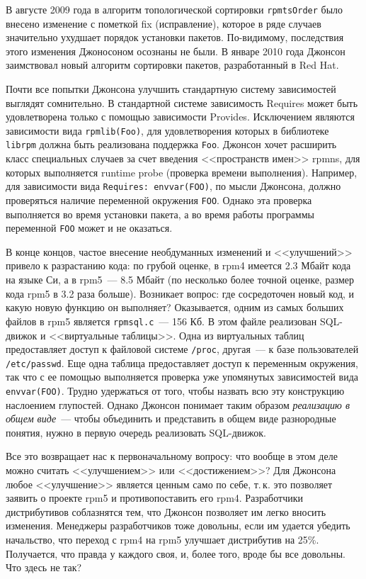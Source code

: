\documentclass[russian,a4paper,12pt,titlepage]{article}
\begin{document}
В августе 2009 года в алгоритм топологической сортировки \verb|rpmtsOrder| было внесено изменение с пометкой fix
(исправление), которое в ряде случаев значительно ухудшает порядок установки пакетов.  По-видимому, последствия
этого изменения Джоносоном осознаны не были.  В январе 2010 года Джонсон заимствовал новый алгоритм сортировки
пакетов, разработанный в Red Hat.

Почти все попытки Джонсона улучшить стандартную систему зависимостей выглядят сомнительно.  В стандартной системе
зависимость Requires может быть удовлетворена только с помощью зависимости Provides.  Исключением являются зависимости
вида \verb|rpmlib(Foo)|, для удовлетворения которых в библиотеке \verb|librpm| должна быть реализована поддержка \verb|Foo|.
Джонсон хочет расширить класс специальных случаев за счет введения <<пространств имен>> rpmns, для которых выполняется
runtime probe (проверка времени выполнения).  Например, для зависимости вида \verb|Requires: envvar(FOO)|, по мысли Джонсона,
должно проверяться наличие переменной окружения \verb|FOO|.  Однако эта проверка выполняется во время установки пакета,
а во время работы программы переменной \verb|FOO| может и не оказаться.

В конце концов, частое внесение необдуманных изменений и <<улучшений>> привело к разрастанию кода: по грубой оценке,
в rpm4 имеется 2.3 Мбайт кода на языке Си, а в rpm5~--- 8.5 Мбайт (по несколько более точной оценке, размер кода
rpm5 в 3.2 раза больше).  Возникает вопрос: где сосредоточен новый код, и какую новую функцию он выполняет?
Оказывается, одним из самых больших файлов в rpm5 является \verb|rpmsql.c|~--- 156 Кб.  В этом файле
реализован SQL-движок и <<виртуальные таблицы>>.  Одна из виртуальных таблиц предоставляет
доступ к файловой системе \verb|/proc|, другая~--- к базе пользователей \verb|/etc/passwd|.  Еще одна таблица
предоставляет доступ к переменным окружения, так что с ее помощью выполняется проверка уже упомянутых зависимостей
вида \verb|envvar(FOO)|.  Трудно удержаться от того, чтобы назвать всю эту конструкцию наслоением глупостей.
Однако Джонсон понимает таким образом \emph{реализацию в общем виде}~--- чтобы объединить и представить в общем виде
разнородные понятия, нужно в первую очередь реализовать SQL-движок.

Все это возвращает нас к первоначальному вопросу: что вообще в этом деле можно считать <<улучшением>> или <<достижением>>?
Для Джонсона любое <<улучшение>> является ценным само по себе, т.\,к. это позволяет заявить о проекте rpm5 и противопоставить
его rpm4.  Разработчики дистрибутивов соблазнятся тем, что Джонсон позволяет им легко вносить изменения.  Менеджеры разработчиков
тоже довольны, если им удается убедить начальство, что переход с rpm4 на rpm5 улучшает дистрибутив на 25\%.
Получается, что правда у каждого своя, и, более того, вроде бы все довольны.  Что здесь не так?
\end{document}
